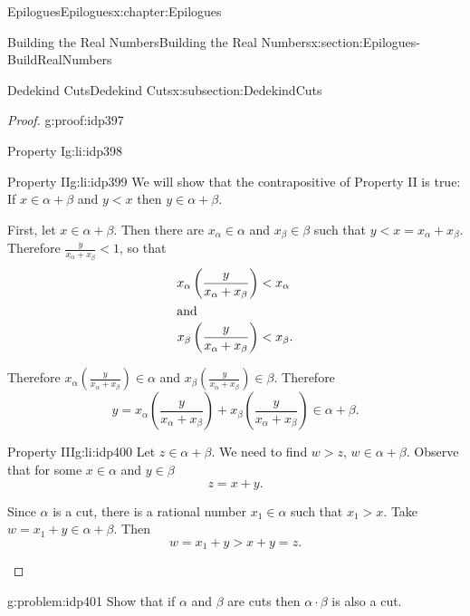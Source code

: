 \begin{chapterptx}{Epilogues}{}{Epilogues}{}{}{x:chapter:Epilogues}
\begin{sectionptx}{Building the Real Numbers}{}{Building the Real Numbers}{}{}{x:section:Epilogues-BuildRealNumbers}
\begin{subsectionptx}{Dedekind Cuts}{}{Dedekind Cuts}{}{}{x:subsection:DedekindCuts}
\begin{proof}{}{g:proof:idp397}
\begin{descriptionlist}
\begin{dlimedium}{Property I}{g:li:idp398}
					\end{dlimedium}%
					\begin{dlimedium}{Property II}{g:li:idp399}%
						We will show that the contrapositive of \alert{Property II} is true: If \(x\in\alpha+\beta\) and \(y\lt x\) then \(y\in\alpha+\beta\).%
						\par
						First, let \(x\in\alpha+\beta\). Then there are \(x_\alpha\in\alpha\) and \(x_\beta\in\beta\) such that \(y\lt x=x_\alpha+x_\beta\). Therefore \(\frac{y}{x_\alpha+x_\beta}\lt  1\), so that%
						\begin{align*}
							x_\alpha\left(\frac{y}{x_\alpha+x_\beta}\right)& <  x_\alpha\\
							\intertext{and}
							x_\beta\left(\frac{y}{x_\alpha+x_\beta}\right)& <  x_\beta\text{.}
						\end{align*}
						\par
						Therefore \(x_\alpha\left(\frac{y}{x_\alpha+x_\beta}\right)\in\alpha\) and \(x_\beta\left(\frac{y}{x_\alpha+x_\beta}\right)\in\beta\). Therefore%
						\begin{equation*}
							y=x_\alpha\left(\frac{y}{x_\alpha+x_\beta}\right)+x_\beta\left(\frac{y}{x_\alpha+x_\beta}\right)\in\alpha+\beta\text{.}
						\end{equation*}
					\end{dlimedium}%
					\begin{dlimedium}{Property III}{g:li:idp400}%
						Let \(z\in\alpha+\beta\). We need to find \(w>z\), \(w\in\alpha+\beta\). Observe that for some \(x\in\alpha\) and \(y\in\beta\)%
						\begin{equation*}
							z=x+y\text{.}
						\end{equation*}
						\par
						Since \(\alpha\) is a cut, there is a rational number \(x_1\in\alpha\) such that \(x_1>x\). Take \(w=x_1+y\in\alpha+\beta\). Then%
						\begin{equation*}
							w=x_1+y>x+y=z\text{.}
						\end{equation*}
					\end{dlimedium}%
				\end{descriptionlist}
			\end{proof}
			\begin{problem}{}{g:problem:idp401}%
				 Show that if \(\alpha\) and \(\beta\) are cuts then \(\alpha\cdot\beta\) is also a cut.%
			\end{problem}

\end{subsectionptx}
\end{sectionptx}
\end{chapterptx}
